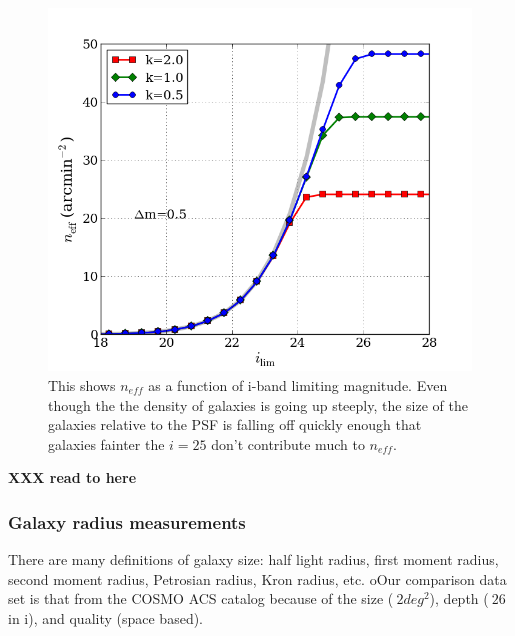\documentclass[]{article}
\begin{document}
{%
\begin{figure}[H]
\centering
\includegraphics[width=5in]{validation_figures/neff_m_ir.png}
\caption{This shows $n_{eff}$ as a function of i-band limiting magnitude.  Even though the the density of galaxies is going up steeply, the 
size of the galaxies relative to the PSF is falling off quickly enough that galaxies fainter the $i=25$ don't contribute much to $n_{eff}$.\label{fig:neffvm}}
\end{figure}

{\bf XXX read to here}

\subsubsection{Galaxy radius measurements}
There are many definitions of galaxy size: half light radius, first moment radius, second moment radius, Petrosian radius, Kron radius, etc.
oOur comparison data set is that from the COSMO ACS catalog \citep{cosmos} because of the size ($~2deg^2$), depth ($~26$ in i), and
quality (space based).  

}
\end{document}
